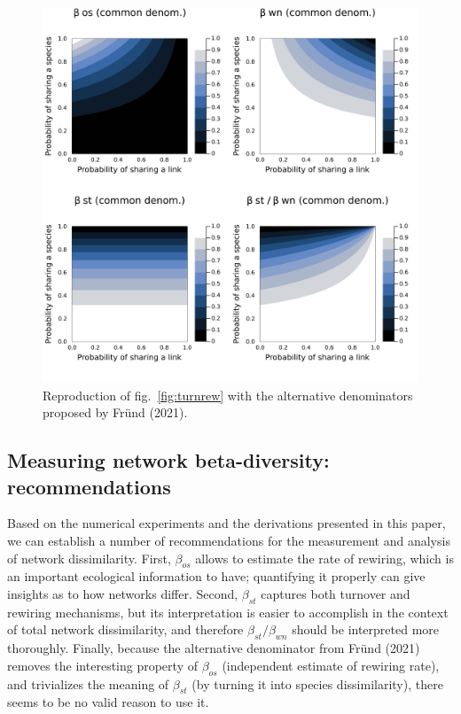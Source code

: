 \documentclass[11pt]{article}
\makeatletter
\def\maxwidth{\ifdim\Gin@nat@width>\linewidth\linewidth
\else\Gin@nat@width\fi}
\let\Oldincludegraphics\includegraphics
\renewcommand{\includegraphics}[1]{\Oldincludegraphics[width=\maxwidth]{#1}}
\makeatother
\begin{document}
\begin{figure}
\hypertarget{fig:commden}{%
\centering
\includegraphics{figures/common_denominator/components.png}
\caption{Reproduction of fig.~\ref{fig:turnrew} with the alternative
denominators proposed by Fründ (2021).}\label{fig:commden}
}
\end{figure}

\hypertarget{measuring-network-beta-diversity-recommendations}{%
\subsection{Measuring network beta-diversity:
recommendations}\label{measuring-network-beta-diversity-recommendations}}

Based on the numerical experiments and the derivations presented in this
paper, we can establish a number of recommendations for the measurement
and analysis of network dissimilarity. First, \(\beta_{os}\) allows to
estimate the rate of rewiring, which is an important ecological
information to have; quantifying it properly can give insights as to how
networks differ. Second, \(\beta_{st}\) captures both turnover and
rewiring mechanisms, but its interpretation is easier to accomplish in
the context of total network dissimilarity, and therefore
\(\beta_{st}/\beta_{wn}\) should be interpreted more thoroughly.
Finally, because the alternative denominator from Fründ (2021) removes
the interesting property of \(\beta_{os}\) (independent estimate of
rewiring rate), and trivializes the meaning of \(\beta_{st}\) (by
turning it into species dissimilarity), there seems to be no valid
reason to use it.
\end{document}

